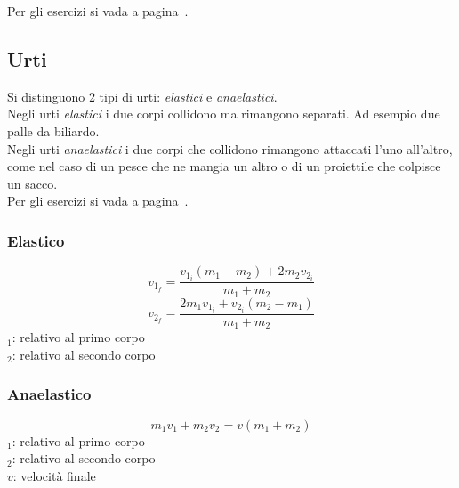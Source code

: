 \begin{center}
\end{center}
Per gli esercizi si vada a pagina~\pageref{ex:impulso}.

\subsection{Urti}\label{subsec:dinamica:urti}
Si distinguono 2 tipi di urti: \emph{elastici} e \emph{anaelastici}.\\[\baselineskip]
Negli urti \emph{elastici} i due corpi collidono ma rimangono separati. Ad esempio due palle
da biliardo.\\
Negli urti \emph{anaelastici} i due corpi che collidono rimangono attaccati l'uno all'altro,
come nel caso di un pesce che ne mangia un altro o di un proiettile che colpisce un sacco.\\

Per gli esercizi si vada a pagina~\pageref{ex:urti}.

\subsubsection{Elastico}
\begin{equation*}
v_{1_f} = \frac{v_{1_i}\left(m_1-m_2\right) + 2m_2v_{2_i}}{m_1+m_2}
\end{equation*}
\begin{equation*}
v_{2_f} = \frac{2m_1v_{1_i} + v_{2_i}\left(m_2-m_1\right)}{m_1+m_2}
\end{equation*}
$_1$: relativo al primo corpo\\
$_2$: relativo al secondo corpo

\subsubsection{Anaelastico}
\begin{equation*}
m_1v_1 + m_2v_2 = v(m_1+m_2)
\end{equation*}
$_1$: relativo al primo corpo\\
$_2$: relativo al secondo corpo\\
$v$: velocità finale

